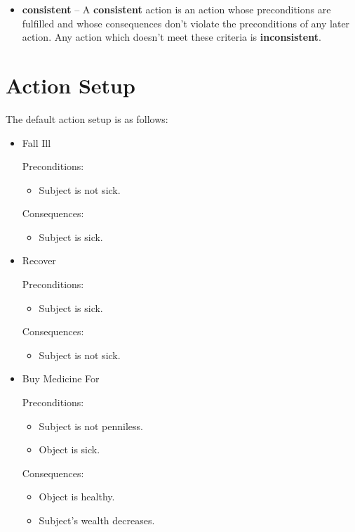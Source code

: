 \documentclass[12pt]{article}
\begin{document}
\begin{itemize}
  \item \textbf{consistent} -- A \textbf{consistent} action is an action whose preconditions are fulfilled and whose consequences don't violate the preconditions of any later action. Any action which doesn't meet these criteria is \textbf{inconsistent}.
\end{itemize}

\section{Action Setup}
\label{actions}

The default action setup is as follows:

\begin{itemize}
  \item Fall Ill

    Preconditions:
    \begin{itemize}
      \item Subject is not sick.
    \end{itemize}

    Consequences:
    \begin{itemize}
      \item Subject is sick.
    \end{itemize}

  \item Recover

    Preconditions:
    \begin{itemize}
      \item Subject is sick.
    \end{itemize}

    Consequences:
    \begin{itemize}
      \item Subject is not sick.
    \end{itemize}

  \item Buy Medicine For

    Preconditions:
    \begin{itemize}
      \item Subject is not penniless.
      \item Object is sick.
    \end{itemize}

    Consequences:
    \begin{itemize}
      \item Object is healthy.
      \item Subject's wealth decreases.
    \end{itemize}


\end{itemize}
\end{document}
